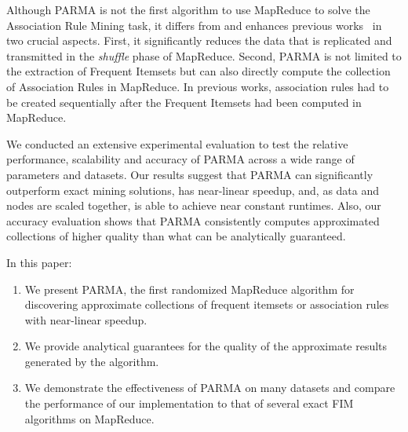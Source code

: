 Although PARMA is not the first algorithm to use MapReduce to solve the
Association Rule Mining task, it differs from and enhances previous
works~\cite{CryansRC10,GhotingKPK11,Hammoud11,LiWZZC08,LiZ11,YangLF10,ZhouZCLF10}
in two crucial aspects. First, it significantly reduces the data that is
replicated and transmitted in the \emph{shuffle} phase of MapReduce.  Second,
PARMA is not limited to the extraction of Frequent Itemsets but can also
directly compute the collection of Association Rules in MapReduce. In previous
works, association rules had to be created sequentially after the Frequent
Itemsets had been computed in MapReduce. 

We conducted an extensive experimental evaluation to test the relative
performance, scalability and accuracy of PARMA across a wide range of
parameters and datasets. Our results suggest that PARMA can
significantly outperform exact mining solutions, has
near-linear speedup, and, as data and nodes are scaled together, is
able to achieve near constant runtimes. Also, our accuracy evaluation
shows that PARMA consistently computes approximated collections
of higher quality than what can be analytically guaranteed.

In this paper:
\begin{enumerate}
\item We present PARMA, the first randomized MapReduce algorithm for discovering
  approximate collections of frequent itemsets or association rules with
  near-linear speedup.
\item We provide analytical guarantees for the quality of the approximate
  results generated by the algorithm.
\item We demonstrate the effectiveness of PARMA on many datasets and compare
  the performance of our implementation to that of several exact FIM algorithms
  on MapReduce.
\end{enumerate}


